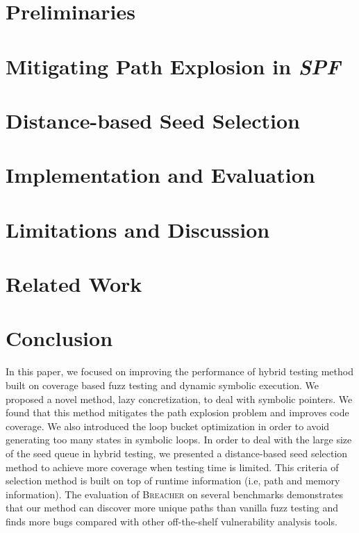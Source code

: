 \documentclass{cta-author}
\newcommand{\prototype}{\textsc{Breacher} }
\begin{document}
\section{Preliminaries} \label{sec:preliminaries}


\section{Mitigating Path Explosion in \textit{SPF}} \label{sec:ease PE}


\section{Distance-based Seed Selection} \label{sec:seed selection}


\section{Implementation and Evaluation} \label{sec:evaluate}




\section{Limitations and Discussion} \label{sec:discussion}


\section{Related Work} \label{sec:related}


\section{Conclusion} \label{sec:conclusion}
In this paper, we focused on improving the performance of hybrid 
testing method built on coverage based fuzz testing and dynamic 
symbolic execution. We proposed a novel method, lazy concretization, 
to deal with symbolic pointers. We found that this method mitigates 
the path explosion problem and improves code coverage. We also introduced 
the loop bucket optimization in order to avoid generating too many 
states in symbolic loops. In order to deal with the large size of 
the seed queue in hybrid testing, we presented a distance-based seed 
selection method to achieve more coverage when testing time is limited. 
This criteria of selection method is built on top of runtime information 
(i.e, path and memory information). The evaluation of \prototype 
on several benchmarks demonstrates that our method can discover more 
unique paths than vanilla fuzz testing and finds more bugs compared 
with other off-the-shelf vulnerability analysis tools.




\vfill\pagebreak
\end{document}
